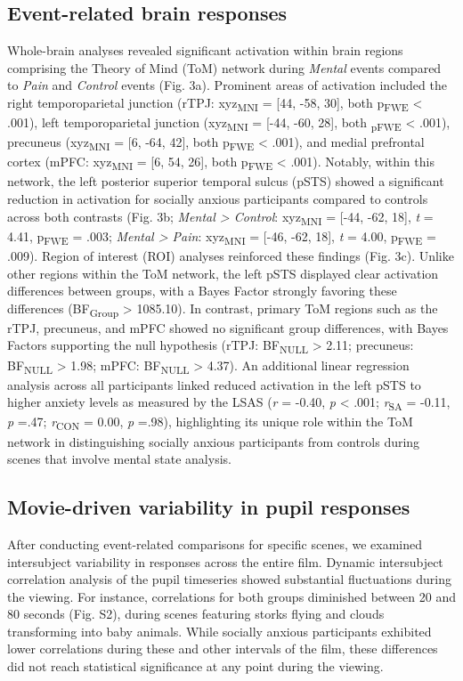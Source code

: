 \subsection*{Event-related brain responses}
Whole-brain analyses revealed significant activation within brain regions comprising the Theory of Mind (ToM) network during \textit{Mental} events compared to \textit{Pain} and \textit{Control} events (Fig. 3a). Prominent areas of activation included the right temporoparietal junction (rTPJ: xyz\textsubscript{MNI} = [44, -58, 30], both p\textsubscript{FWE} < .001), left temporoparietal junction (xyz\textsubscript{MNI} = [-44, -60, 28], both \textsubscript{pFWE} < .001), precuneus (xyz\textsubscript{MNI} = [6, -64, 42], both p\textsubscript{FWE} < .001), and medial prefrontal cortex (mPFC: xyz\textsubscript{MNI} = [6, 54, 26], both p\textsubscript{FWE} < .001). Notably, within this network, the left posterior superior temporal sulcus (pSTS) showed a significant reduction in activation for socially anxious participants compared to controls across both contrasts (Fig. 3b; \textit{Mental > Control}: xyz\textsubscript{MNI} = [-44, -62, 18], \textit{t} = 4.41, p\textsubscript{FWE} = .003; \textit{Mental > Pain}: xyz\textsubscript{MNI} = [-46, -62, 18], \textit{t} = 4.00, p\textsubscript{FWE} = .009). 
Region of interest (ROI) analyses reinforced these findings (Fig. 3c). Unlike other regions within the ToM network, the left pSTS displayed clear activation differences between groups, with a Bayes Factor strongly favoring these differences (BF\textsubscript{Group} > 1085.10). In contrast, primary ToM regions such as the rTPJ, precuneus, and mPFC showed no significant group differences, with Bayes Factors supporting the null hypothesis (rTPJ: BF\textsubscript{NULL} > 2.11; precuneus: BF\textsubscript{NULL} > 1.98; mPFC: BF\textsubscript{NULL} > 4.37). An additional linear regression analysis across all participants linked reduced activation in the left pSTS to higher anxiety levels as measured by the LSAS (\textit{r} = -0.40, \textit{p} < .001; \textit{r}\textsubscript{SA} = -0.11, \textit{p} =.47; \textit{r}\textsubscript{CON} = 0.00, \textit{p} =.98), highlighting its unique role within the ToM network in distinguishing socially anxious participants from controls during scenes that involve mental state analysis.

\subsection*{Movie-driven variability in pupil responses}
After conducting event-related comparisons for specific scenes, we examined intersubject variability in responses across the entire film. Dynamic intersubject correlation analysis of the pupil timeseries showed substantial fluctuations during the viewing. For instance, correlations for both groups diminished between 20 and 80 seconds (Fig. S2), during scenes featuring storks flying and clouds transforming into baby animals. While socially anxious participants exhibited lower correlations during these and other intervals of the film, these differences did not reach statistical significance at any point during the viewing.

